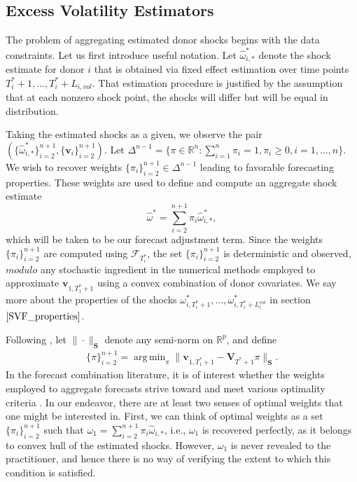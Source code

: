 \documentclass[11pt,3p,review,authoryear]{elsarticle}
\newcommand{\weight}{\pi}
\newcommand{\x}{\textbf{v}}
\newcommand{\V}{\textbf{V}}
\DeclareMathOperator*{\argmin}{arg\,min} %
\theoremstyle{definition}
\begin{document}
\subsection{Excess Volatility Estimators}
    \label{Excess Volatility Estimators}
   
    The problem of aggregating estimated donor shocks begins with the data constraints.  Let us first introduce useful notation.  Let $\hat\omega^{*}_{i,*}$ denote the shock estimate for donor $i$ that is obtained via fixed effect estimation over time points $T_{i}^{*}+1,...,T_{i}^{*}+L_{i,vol}$.  That estimation procedure is justified by the assumption that at each nonzero shock point, the shocks will differ but will be equal in distribution.  
    
    Taking the estimated shocks as a given, we observe the pair $(\{\hat\omega^{*}_{i,*}\}^{n+1}_{i=2},\{\textbf{v}_{i}\}^{n+1}_{i=2})$.  Let $\Delta^{n-1} = \{\pi \in \mathbb{R}^n: \sum_{i=1}^n \pi_i = 1, \pi_i \geq 0, i = 1,...,n\}$.  We wish to recover weights $\{\weight_{i}\}^{n+1}_{i=2} \in \Delta^{n-1}$ leading to favorable forecasting properties.  These weights are used to define and compute an aggregate shock estimate 
\begin{equation} \label{adjustment}
	  \hat\omega^{*} = \sum^{n+1}_{i=2}\weight_{i}\hat\omega^{*}_{i,*},
\end{equation}
    which will be taken to be our forecast adjustment term.  Since the weights $\{\weight_{i}\}_{i=2}^{n+1}$ are computed using $\mathcal{F}_{T^{*}_{i}}$, the set $\{\weight_{i}\}_{i=2}^{n+1}$ is deterministic and observed, $\textit{modulo}$ any stochastic ingredient in the numerical methods employed to approximate $\x_{1,T_{1}^{*}+1}$ using a convex combination of donor covariates.  We say more about the properties of the shocks $\omega^{*}_{i,T_{i}^{*}+1},...,\omega^{*}_{i,T_{i}^{*}+L^{vol}_{i}}$ in section $\ref{SVF_properties}$. 

    Following \citet{abadie2003economic,abadie2010synthetic,lin2021minimizing}, let $\|\cdot\|_{\textbf{S}}$ denote any semi-norm on $\mathbb{R}^{p}$, and define
    \begin{align*}
    \{\pi\}_{i=2}^{n+1} = \argmin_{\pi}\|\x_{1,T_{1}^* + 1} - \V_{T^* + 1}\pi\|_{\textbf{S}}. 
    \end{align*}
In the forecast combination literature, it is of interest whether the weights employed to aggregate forecasts strive toward and meet various optimality criteria \citep{timmermann2006forecast,wang2023forecast}.  In our endeavor, there are at least two senses of optimal weights that one might be interested in.  First, we can think of optimal weights as a set $\{\weight_{i}\}_{i=2}^{n+1}$ such that $\omega_{1} = \sum^{n+1}_{i=2}\weight_{i}\hat\omega_{i,*}$, i.e., $\omega_{1}$ is recovered perfectly, as it belongs to convex hull of the estimated shocks. However, $\omega_{1}$ is never revealed to the practitioner, and hence there is no way of verifying the extent to which this condition is satisfied.
\end{document}
